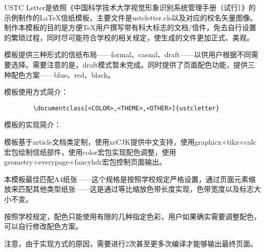 \documentclass[blue,casual,12pt]{ustcletter}
\begin{document}
USTC Letter是依照《中国科学技术大学视觉形象识别系统管理手册（试行）》的示例制作的LaTeX信纸模板，主要文件是ustcletter.cls以及对应的校名矢量图像。制作本模板的目的是方便TeX用户撰写带有科大标志的文档/信件，免去自行设置的繁琐过程，同时尽可能符合学校的相关规定，使生成的文件更加正式、美观。

模板提供三种形式的信纸布局——formal、casual、draft——以供用户根据不同需要选择。需要注意的是，draft模式暂未完成。同时提供了页面配色功能，提供三种配色方案——blue、red、black。

模板使用方式简介：
\begin{verbatim}
        \documentclass[<COLOR>,<THEME>,<OTHER>]{ustcletter}
\end{verbatim}


模板的实现简介：

模板基于article文档类定制，使用xeCJK提供中文支持，使用graphicx+tikz+calc宏包绘制信纸部件，使用color宏包实现配色调整，使用geometry+everypage+fancyhdr宏包控制页面输出。

本模板最佳匹配A4纸张——这个规格是按照学校规定严格设置，通过页面元素缩放来匹配其他类型纸张——这是通过等比缩放色带长度实现，色带宽度以及标志大小不变。

按照学校规定，配色只能使用有限的几种指定色彩，用户如果确实需要调整配色，可以自行修改配色方案。

注意，由于实现方式的原因，需要进行2次甚至更多次编译才能够输出最终页面。

~

~

\lipsum[1-5]
\end{document}
